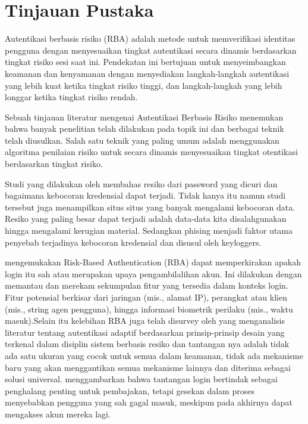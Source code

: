 \chapter{Tinjauan Pustaka}

Autentikasi berbasis risiko (RBA) adalah metode untuk memverifikasi identitas
pengguna dengan menyesuaikan tingkat autentikasi secara dinamis berdasarkan
tingkat risiko sesi saat ini. Pendekatan ini bertujuan untuk menyeimbangkan
keamanan dan kenyamanan dengan menyediakan langkah-langkah autentikasi yang
lebih kuat ketika tingkat risiko tinggi, dan langkah-langkah yang lebih longgar
ketika tingkat risiko rendah.

Sebuah tinjauan literatur mengenai Autentikasi Berbasis Risiko menemukan
bahwa banyak penelitian telah dilakukan pada topik ini dan berbagai teknik telah
diusulkan. Salah satu teknik yang paling umum adalah menggunakan algoritma
penilaian risiko untuk secara dinamis menyesuaikan tingkat otentikasi berdasarkan
tingkat risiko.

Studi yang dilakukan oleh \cite{thomas_data_2017} membahas resiko dari password
yang dicuri dan bagaimana kebocoran kredensial dapat terjadi. Tidak hanya itu
namun studi tersebut juga menampilkan situs situs yang banyak mengalami
kebocoran data. Resiko yang paling besar dapat terjadi adalah data-data kita
disalahgunakan hingga mengalami kerugian material. Sedangkan phising menjadi
faktor utama penyebab terjadinya kebocoran kredensial dan disusul oleh
keyloggers.

\cite{stephan_wiefling_pump_2022} mengemukakan Risk-Based Authentication
(RBA) dapat memperkirakan apakah login itu sah atau merupakan upaya
pengambilalihan akun. Ini dilakukan dengan memantau dan merekam sekumpulan
fitur yang tersedia dalam konteks login. Fitur potensial berkisar dari jaringan (mis.,
alamat IP), perangkat atau klien (mis., string agen pengguna), hingga informasi
biometrik perilaku (mis., waktu masuk).Selain itu kelebihan RBA juga telah disurvey oleh \cite{cabarcos_survey_2019} yang
menganalisis literatur tentang autentikasi adaptif berdasarkan prinsip-prinsip desain
yang terkenal dalam disiplin sistem berbasis resiko dan tantangan nya adalah tidak
ada satu ukuran yang cocok untuk semua dalam keamanan, tidak ada mekanisme baru yang akan menggantikan semua mekanisme lainnya dan diterima sebagai
solusi universal. \cite{doerfler_evaluating_2019} menggambarkan bahwa tantangan login
bertindak sebagai penghalang penting untuk pembajakan, tetapi gesekan dalam
proses menyebabkan pengguna yang sah gagal masuk, meskipun pada akhirnya
dapat mengakses akun mereka lagi.

